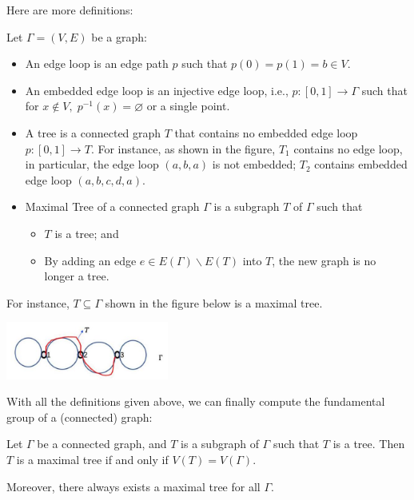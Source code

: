 Here are more definitions:
\begin{definition}
Let $\Gamma = (V,E)$ be a graph:
\begin{itemize}
\item An edge loop is an edge path \(p\) such that \(p\left( 0\right)  = p\left( 1\right)  = b \in  V\).
\item An embedded edge loop is an injective edge loop, i.e., \(p: \left\lbrack  {0,1}\right\rbrack   \rightarrow  \Gamma\) such that for \(x \notin  V,\;{p}^{-1}\left( x\right)  = \varnothing\) or a single point.
\item A tree is a connected graph \(T\) that contains no embedded edge loop \(p: \left\lbrack  {0,1}\right\rbrack   \rightarrow  T\). For instance, as shown in the figure, \({T}_{1}\) contains no edge loop, in particular, the edge loop $(a, b, a)$ is not embedded; \({T}_{2}\) contains embedded edge loop $(a, b, c, d, a)$.

\item Maximal Tree of a connected graph \(\Gamma\) is a subgraph \(T\) of \(\Gamma\) such that 
\begin{itemize}
    \item \(T\) is a tree; and 
    \item By adding an edge \(e \in  E\left( \Gamma \right)  \smallsetminus  E\left( T\right)\) into \(T\), the new graph is no longer a tree.
\end{itemize}
 \end{itemize}
 \end{definition}


For instance, \(T \subseteq  \Gamma\) shown in the figure below is a maximal tree.
\begin{center}
\includegraphics[width=0.4\textwidth]{images/Ch8_maximal_tree.jpg}
\end{center}

With all the definitions given above, we can finally compute the fundamental group of a (connected) graph:
\begin{theorem} \label{thm:max_tree_exists} Let \(\Gamma\) be a connected graph, and \(T\) is a subgraph of \(\Gamma\) such that \(T\) is a tree. Then \(T\) is a maximal tree if and only if \(V\left( T\right)  = V\left( \Gamma \right)\).

Moreover, there always exists a maximal tree for all \(\Gamma\).
\end{theorem}

